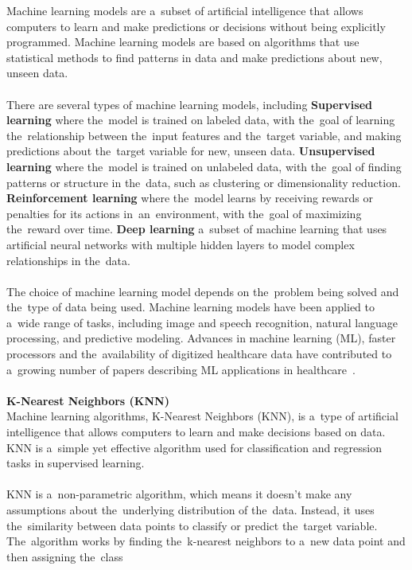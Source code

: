     Machine learning models are a~subset of artificial intelligence that allows computers to learn and make
predictions or decisions without being explicitly programmed. Machine learning models are based on algorithms
that use statistical methods to find patterns in data and make predictions about new, unseen data.\\
    \\
    There are several types of machine learning models, including \textbf{Supervised learning} where the~model is trained on labeled data, with the~goal of learning the~relationship between the~input features and the~target variable, and making predictions about the~target variable for new, unseen data.
\textbf{Unsupervised learning} where the~model is trained on unlabeled data, with the~goal of finding patterns or structure in the~data, such as clustering or dimensionality reduction. \textbf{Reinforcement learning} where the~model learns by receiving rewards or penalties for its actions in~an~environment, with the~goal of maximizing the~reward over time. \textbf{Deep learning} a~subset of machine learning that uses artificial neural networks with multiple hidden layers to model complex relationships in the~data.\\
    \\
    The choice of machine learning model depends on the~problem being solved and the~type of data being used. Machine learning models have been applied to a~wide range of tasks, including image and speech recognition, natural language processing, and predictive modeling. Advances in machine learning (ML), faster processors and the~availability of digitized healthcare data have contributed to a~growing number of papers describing ML applications in healthcare~\cite{Chen}.\\
    \\
    \noindent \textbf{K-Nearest Neighbors (KNN)} \label{sec:knn}\\
    Machine learning algorithms, K-Nearest Neighbors (KNN), is a~type of artificial intelligence that allows
computers to learn and make decisions based on data. KNN is a~simple yet effective algorithm used for
classification and regression tasks in supervised learning.\\
    \\
    KNN is a~non-parametric algorithm, which means it doesn't make any assumptions about the~underlying
distribution of the~data. Instead, it uses the~similarity between data points to classify or predict the~target
variable. The~algorithm works by finding the~k-nearest neighbors to a~new data point and then assigning the~class
